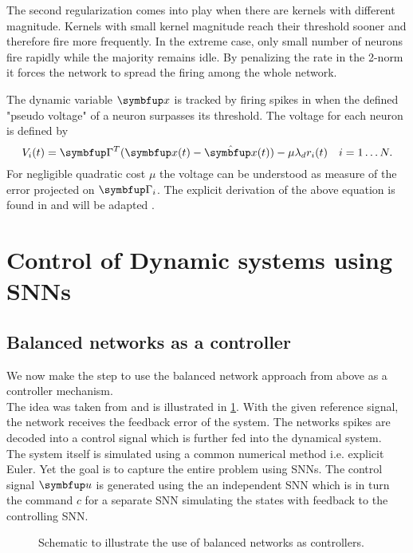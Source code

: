 The second regularization comes into play when there are kernels with different magnitude. Kernels with small kernel magnitude reach their threshold sooner and therefore fire more frequently. In the extreme case, only small number of neurons fire rapidly while the majority remains idle. By penalizing the rate in the 2-norm it forces the network to spread the firing among the whole network.\\


The dynamic variable $\bmu{x}$ is tracked by firing spikes in when the defined "pseudo voltage" of a neuron surpasses its threshold. The voltage for each neuron is defined by
\begin{equation}\label{eq:voltage}
V_i(t)=\bmu{\Gamma}^T(\bmu{x}(t)-\hat{\bmu{x}}(t))-\mu \lambda_d r_i(t)
\quad i  = 1\dots N.
\end{equation}
For negligible quadratic cost $\mu$ the voltage can be understood as measure of the error projected on $\bmu{\Gamma}_i$. The explicit derivation of the above equation is found in \cite{boerlin_predictive_2013} and will be adapted .
\section{Control of Dynamic systems using \acp{SNN}}
\subsection{Balanced networks as a controller}
We now make the step to use the balanced network approach from above as a controller mechanism.\\
The idea was taken from \cite{huang_optimizing_2017} and is illustrated in \cref{fig:schematic}. With the given reference signal, the network receives the feedback error of the system. The networks spikes are decoded into a control signal which is further fed into the dynamical system.\\
The system itself is simulated using a common numerical method i.e. explicit Euler. Yet the goal is to capture the entire problem using \acp{SNN}. The control signal $\bmu{u}$ is generated using the an independent \ac{SNN} which is in turn the command $c$ for a separate \ac{SNN} simulating the states with feedback to the controlling \ac{SNN}.
\begin{figure}
	\centering
	\caption{Schematic to illustrate the use of balanced networks as controllers.}
	\label{fig:schematic}
\end{figure}
